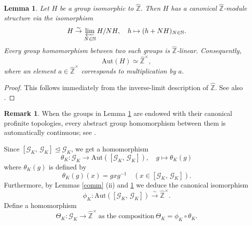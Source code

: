 \documentclass[reqno,11pt]{article}
\theoremstyle{plain} %
\newtheorem{lemma}[theorem]{\indent\sc Lemma}
\theoremstyle{definition} %
\newtheorem{remark}[theorem]{\indent\sc Remark}
\begin{document}
\begin{lemma}\label{Aut}
Let $H$ be a group isomorphic to $\widehat{\mathbb{Z}}$. Then $H$ has a canonical
$\widehat{\mathbb{Z}}$-module structure via the isomorphism
\begin{equation*}
H\stackrel{\sim}{\rightarrow}\varprojlim_{N\in\mathbb{N}} H/NH,\quad
h\mapsto (h+NH)_{N\in\mathbb{N}}.
\end{equation*}
Every group homomorphism between two such
groups is $\widehat{\mathbb{Z}}$-linear.
Consequently, 
\begin{equation*}
\mathrm{Aut}(H)\simeq\widehat{\mathbb{Z}}^\times,
\end{equation*}
where an element $a\in\widehat{\mathbb{Z}}^\times$ corresponds to multiplication by $a$.
\end{lemma}
\begin{proof}
This follows immediately from the inverse-limit description
of $\widehat{\mathbb{Z}}$. 
See also \cite[Theorem 4.4.7 and Corollary 4.4.8]{R-Z}. 
\end{proof}

\begin{remark}
When the groups in Lemma \ref{Aut} are endowed with their canonical profinite
topologies, every abstract group homomorphism between them is automatically
continuous; see \cite[Theorem 1.1]{N-S}. 
\end{remark}

Since $[\mathcal{G}_K,\,\mathcal{G}_K]\trianglelefteq \mathcal{G}_K$, we get a homomorphism
\begin{equation*}
\theta_K:\mathcal{G}_K\rightarrow\mathrm{Aut}([\mathcal{G}_K,\,\mathcal{G}_K]),
\quad g\mapsto\theta_K(g)
\end{equation*}
where $\theta_K(g)$ is defined by 
\begin{equation*}
\theta_K(g)(x)=gxg^{-1}\quad(x\in[\mathcal{G}_K,\,\mathcal{G}_K]).
\end{equation*}
Furthermore, by Lemmas \ref{comm} (ii) and \ref{Aut} we deduce the canonical isomorphism
\begin{equation*}
\phi_K:\mathrm{Aut}([\mathcal{G}_K,\,\mathcal{G}_K])\stackrel{\sim}{\rightarrow}\widehat{\mathbb{Z}}^\times. 
\end{equation*}
Define a homomorphism
\begin{equation*}
\Theta_K:\mathcal{G}_K\rightarrow\widehat{\mathbb{Z}}^\times
~\textrm{as the composition}~\Theta_K=\phi_K\circ\theta_K. 
\end{equation*}
\end{document}
